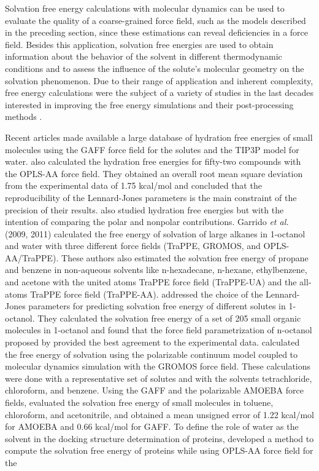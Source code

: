 Solvation free energy calculations with molecular dynamics can be used to evaluate the quality of a coarse-grained force field, such as the models described in the preceding section, since these estimations can reveal deficiencies in a force field. Besides this application, solvation free energies are used to obtain information about the behavior of the solvent in different thermodynamic conditions and to assess the influence of the solute's molecular geometry on the solvation phenomenon. Due to their range of application and inherent complexity, free energy calculations were the subject of a variety of studies in the last decades interested in improving the free energy simulations and their post-processing methods \cite{mbar,bareva,dexp,gdel}.

Recent articles \cite{PMID:24928188,mobley2017} made available a large database of hydration free energies of small molecules using the GAFF force field for the
solutes and the TIP3P model for water.  also calculated the hydration free energies for fifty-two compounds with the OPLS-AA force field. They obtained an overall root mean square deviation from the experimental data of 1.75 kcal/mol and concluded that the reproducibility of the Lennard-Jones parameters is the main constraint of the precision of their results.  also studied hydration free energies but with the intention of comparing the polar and nonpolar contributions. Garrido \textit{et al.} (2009, 2011) calculated the free energy of solvation of large alkanes in 1-octanol and water with three different force fields (TraPPE, GROMOS, and OPLS-AA/TraPPE). These authors also estimated the solvation free energy of propane and benzene in non-aqueous solvents like n-hexadecane, n-hexane, ethylbenzene, and acetone with the united atoms TraPPE force field (TraPPE-UA) and the all-atoms TraPPE force field (TraPPE-AA).  addressed the choice of the Lennard-Jones parameters for predicting solvation free energy of different solutes in 1-octanol. They calculated the solvation free energy of a set of 205 small organic molecules in 1-octanol and found that the force field parametrization of n-octanol proposed by  provided the best agreement to the experimental data.  calculated the free energy of solvation using the polarizable continuum model coupled to molecular dynamics simulation with the GROMOS force field. These calculations were done with a representative set of solutes and with the solvents tetrachloride, chloroform, and benzene. Using the GAFF and the polarizable AMOEBA force fields,  evaluated the solvation free energy of small molecules in toluene, chloroform, and acetonitrile, and obtained a mean unsigned error of 1.22 kcal/mol for AMOEBA and 0.66 kcal/mol for GAFF. To define the role of water as the solvent in the docking structure determination of proteins,  developed a method to compute the solvation free energy of proteins while using OPLS-AA force field for the
